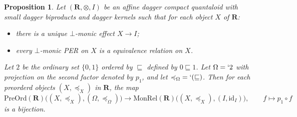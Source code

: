 \documentclass[12pt]{tac}
\newtheorem{proposition}[theorem]{Proposition}
\theoremstyle{definition}
\theoremstyle{remark}
\newcommand{\qo}{{\boldsymbol{\preccurlyeq}}}
\newcommand{\<}{\langle}
\renewcommand{\>}{\rangle}
\renewcommand{\:}{\colon}
\newcommand{\id}{\mathrm{id}}
\begin{document}
\begin{proposition}\label{prop:condition downset monad}
     Let $(\mathbf R,\otimes,I)$ be an affine dagger compact quantaloid with small dagger biproducts and dagger kernels such that for each object $X$ of $\mathbf R$:
    \begin{itemize}
        \item[(1)] there is a unique $\bot$-monic effect $X\to I$;
        \item[(2)] every $\bot$-monic PER on $X$ is a equivalence relation on $X$.
        \end{itemize}
Let $2$ be the ordinary set $\{0,1\}$ ordered by $\sqsubseteq$ defined by $0\sqsubseteq 1$. Let $\Omega=`2$ with projection on the second factor denoted by $p_1$, and let $\qo_\Omega=`(\sqsubseteq)$. 
Then for each preorderd objects $(X,\qo_X)$ in $\mathbf R$, the map 
\[\mathrm{PreOrd}(\mathbf R)\big( (X,\qo_X),(\Omega,\qo_\Omega)\big)\to\mathrm{MonRel}( \mathbf R)\big((X,\qo_X),(I,\id_I)\big),\qquad f\mapsto p_1\circ f\]
is a bijection.
\end{proposition}
\end{document}
